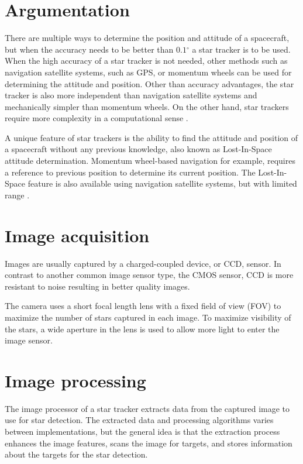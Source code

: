 \documentclass[12pt]{report}
\begin{document}
\section{Argumentation}
There are multiple ways to determine the position and attitude of a spacecraft, but when the accuracy needs to be better than $0.1{^\circ}$ a star tracker is to be used. When the high accuracy of a star tracker is not needed, other methods such as navigation satellite systems, such as GPS, or momentum wheels can be used for determining the attitude and position. Other than accuracy advantages, the star tracker is also more independent than navigation satellite systems and mechanically simpler than momentum wheels. On the other hand, star trackers require more complexity in a computational sense \citep{SatDesgin}.
\par
A unique feature of star trackers is the ability to find the attitude and position of a spacecraft without any previous knowledge, also known as Lost-In-Space attitude determination. Momentum wheel-based navigation for example, requires a reference to previous position to determine its current position. The Lost-In-Space feature is also available using navigation satellite systems, but with limited range \citep{SatDesgin}.

\section{Image acquisition}
Images are usually captured by a charged-coupled device, or CCD, sensor. In contrast to another common image sensor type, the CMOS sensor, CCD is more resistant to noise resulting in better quality images.
\par
The camera uses a short focal length lens with a fixed field of view (FOV) to maximize the number of stars captured in each image. To maximize visibility of the stars, a wide aperture in the lens is used to allow more light to enter the image sensor.

\section{Image processing}
The image processor of a star tracker extracts data from the captured image to use for star detection. The extracted data and processing algorithms varies between implementations, but the general idea is that the extraction process enhances the image features, scans the image for targets, and stores information about the targets for the star detection.
\end{document}
